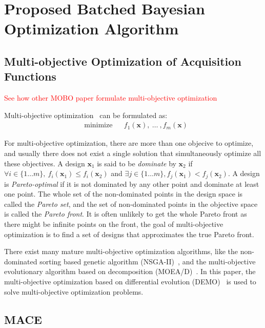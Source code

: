 \section{Proposed Batched Bayesian Optimization Algorithm}

\subsection{Multi-objective Optimization of Acquisition Functions}\label{sec:MOForumlation}

\textcolor{red}{See how other MOBO paper formulate multi-objective optimization}

Multi-objective optimization~\cite{MO_overview} can be formulated as:
\begin{equation}
    \label{eq:MOFormulation}
    \begin{aligned}
        & \text{minimize} & & f_1(\bm{x}),~\dots~,f_m(\bm{x})
    \end{aligned}
\end{equation}

For multi-objective optimization, there are more than one objecive to optimize, and usually there does not exist a single solution that simultaneously optimize all these objectives. A design $\bm{x}_1$ is said to be \emph{dominate} by $\bm{x}_2$ if $\forall i \in \{1\dots m\},~f_i(\bm{x}_1) \le f_i(\bm{x}_2)$ and $\exists j \in \{1\dots m\}, f_j(\bm{x}_1) < f_j(\bm{x}_2)$. A design is \emph{Pareto-optimal} if it is not dominated by any other point and dominate at least one point. The whole set of the non-dominated points in the design space is called the \emph{Pareto set}, and the set of non-dominated points in the objective space is called the \emph{Pareto front}. It is often unlikely to get the whole Pareto front as there might be infinite points on the front, the goal of multi-objective optimization is to find a set of designs that approximates the true Pareto front.

There exist many mature multi-objective optimization algorithms, like the non-dominated sorting based genetic algorithm (NSGA-II)~\cite{nsgaii}, and the multi-objective evolutionary algorithm based on decomposition (MOEA/D)~\cite{moead}. In this paper, the multi-objective optimization based on differential evolution (DEMO)~\cite{demo} is used to solve multi-objective optimization problems.



\subsection{MACE}


